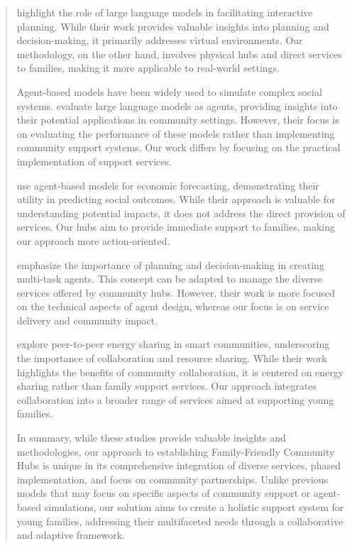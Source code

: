\documentclass{article} %
\begin{document}
\begin{abstract}
\citet{shanahan2023role} highlight the role of large language models in facilitating interactive planning. While their work provides valuable insights into planning and decision-making, it primarily addresses virtual environments. Our methodology, on the other hand, involves physical hubs and direct services to families, making it more applicable to real-world settings.

Agent-based models have been widely used to simulate complex social systems. \citet{liu2023agentbench} evaluate large language models as agents, providing insights into their potential applications in community settings. However, their focus is on evaluating the performance of these models rather than implementing community support systems. Our work differs by focusing on the practical implementation of support services.

\citet{poledna2023economic} use agent-based models for economic forecasting, demonstrating their utility in predicting social outcomes. While their approach is valuable for understanding potential impacts, it does not address the direct provision of services. Our hubs aim to provide immediate support to families, making our approach more action-oriented.

\citet{wang2023describe} emphasize the importance of planning and decision-making in creating multi-task agents. This concept can be adapted to manage the diverse services offered by community hubs. However, their work is more focused on the technical aspects of agent design, whereas our focus is on service delivery and community impact.

\citet{zhou2023peer} explore peer-to-peer energy sharing in smart communities, underscoring the importance of collaboration and resource sharing. While their work highlights the benefits of community collaboration, it is centered on energy sharing rather than family support services. Our approach integrates collaboration into a broader range of services aimed at supporting young families.

In summary, while these studies provide valuable insights and methodologies, our approach to establishing Family-Friendly Community Hubs is unique in its comprehensive integration of diverse services, phased implementation, and focus on community partnerships. Unlike previous models that may focus on specific aspects of community support or agent-based simulations, our solution aims to create a holistic support system for young families, addressing their multifaceted needs through a collaborative and adaptive framework.


\end{abstract}
\end{document}
